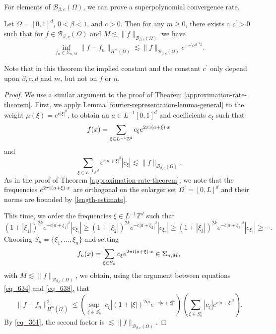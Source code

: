 For elements of $\mathcal{B}_{\beta,c}(\Omega)$, we can prove a superpolynomial convergence rate.
\begin{theorem}\label{spectral-convergence-theorem}
 Let $\Omega = [0,1]^d$, $0 < \beta < 1$, and $c > 0$.
 Then for any $m \geq 0$, there exists a $c^\prime > 0$ such that for $f\in \mathcal{B}_{\beta,c}(\Omega)$ and $M\lesssim \|f\|_{\mathcal{B}_{\beta,c}(\Omega)}$ we have
  \begin{equation}
  \inf_{f_n\in \Sigma_{n,M}} \|f-f_n\|_{H^m(\Omega)} \lesssim \|f\|_{\mathcal{B}_{\beta,c}(\Omega)}e^{-c^\prime n^{d^{-1}\beta}}.
 \end{equation}
\end{theorem}
Note that in this theorem the implied constant and the constant $c^\prime$ only depend upon $\beta,c,d$ and $m$, but not on $f$ or $n$.
\begin{proof}
 We use a similar argument to the proof of Theorem \ref{approximation-rate-theorem}. First, we apply Lemma \ref{fourier-representation-lemma-general} to the weight $\mu(\xi) = e^{c|\xi|^{\beta}}$, to obtain an $a\in L^{-1}[0,1]^d$ and coefficients $c_\xi$ such that
  \begin{equation}
  f(x) = \sum_{\xi\in L^{-1}\mathbb{Z}^d}c_\xi e^{2\pi {\mathrm{i}\mkern1mu}  (a+\xi)\cdot x}
 \end{equation}
 and
 \begin{equation}\label{eq_361}
  \sum_{\xi\in L^{-1}\mathbb{Z}^d}  e^{c|a+\xi|^{\beta}}|c_\xi| \lesssim \|f\|_{\mathcal{B}_{\beta,c}(\Omega)}.
 \end{equation}
 As in the proof of Theorem \ref{approximation-rate-theorem}, we note that the frequencies $e^{2\pi {\mathrm{i}\mkern1mu}  (a+\xi)\cdot x}$ are orthogonal on the enlarger set $\Omega^\prime = [0,L]^d$ and their norms are bounded by \eqref{length-estimate}.
 
 This time, we order the frequencies $\xi\in L^{-1}\mathbb{Z}^d$ such that
 \begin{equation}
  (1+|\xi_1|)^{2k}e^{-c|a+\xi_1|^{\beta}}|c_{\xi_1}| \geq  (1+|\xi_2|)^{2k}e^{-c|a+\xi_2|^{\beta}}|c_{\xi_2}| \geq  (1+|\xi_3|)^{2k}e^{-c|a+\xi_3|^{\beta}}|c_{\xi_3}| \geq \cdots. 
 \end{equation}
 Choosing $S_n = \{\xi_1,...,\xi_n\}$ and setting
 \begin{equation}
  f_n(x) = \sum_{\xi\in S_n}c_\xi e^{2\pi {\mathrm{i}\mkern1mu}  (a+\xi)\cdot x} \in \Sigma_{n,M},
 \end{equation}
 with $M\lesssim \|f\|_{\mathcal{B}_{\beta,c}(\Omega)}$, we obtain, using the argument between equations \eqref{eq_634} and \eqref{eq_638}, that
 \begin{equation}\label{eq_375}
   \|f - f_n\|^2_{H^m(\Omega^\prime)} \leq \left(\sup_{\xi\in S_n^c} |c_\xi|(1+|\xi|)^{2m}e^{-c|a+\xi|^{\beta}} \right)\left(\sum_{\xi\in S_n^c}|c_\xi|e^{c|a+\xi|^{\beta}}\right).
 \end{equation}
 By \eqref{eq_361}, the second factor is $\lesssim \|f\|_{\mathcal{B}_{\beta,c}(\Omega)}$.
 

\end{proof}
